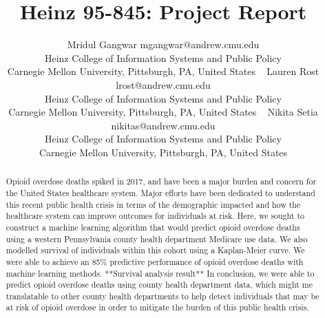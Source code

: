 \documentclass[twoside,10.5pt]{article}
\begin{document}
\title{Heinz 95-845: Project Report}

\author{\name Mridul Gangwar \email mgangwar@andrew.cmu.edu \\
       \addr Heinz College of Information Systems and Public Policy\\
       Carnegie Mellon University, Pittsburgh, PA, United States \
       \AND
       \name Lauren Rost \email lrost@andrew.cmu.edu \\
       \addr Heinz College of Information Systems and Public Policy\\
       Carnegie Mellon University, Pittsburgh, PA, United States \
       \AND
       \name Nikita Setia \email nikitas@andrew.cmu.edu \\
       \addr Heinz College of Information Systems and Public Policy\\
       Carnegie Mellon University, Pittsburgh, PA, United States}
       
\maketitle

\begin{abstract}
Opioid overdose deaths spiked in 2017, and have been a major burden and concern for the United States healthcare system. Major efforts have been dedicated to understand this recent public health crisis in terms of the demographic impacted and how the healthcare system can improve outcomes for individuals at risk. Here, we sought to construct a machine learning algorithm that would predict opioid overdose deaths using a western Pennsylvania county health department Medicare use data. We also modelled survival of individuals within this cohort using a Kaplan-Meier curve. We were able to achieve an 85\% predictive performance of opioid overdose deaths with machine learning methods. **Survival analysis result** In conclusion, we were able to predict opioid overdose deaths using county health department data, which might me translatable to other county health departments to help detect individuals that may be at risk of opioid overdose in order to mitigate the burden of this public health crisis.   
\end{abstract}
\end{document}
